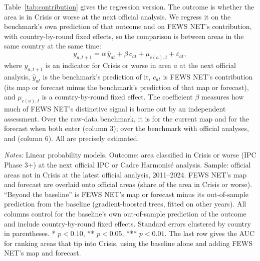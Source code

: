 \documentclass[11pt]{article}
\begin{document}
Table~\ref{tab:contribution} gives the regression version. The outcome is whether the area is in Crisis or worse at the next official analysis. We regress it on the benchmark's own prediction of that outcome and on FEWS NET's contribution, with country-by-round fixed effects, so the comparison is between areas in the same country at the same time:
\begin{equation*}
y_{a,t+1} = \alpha\, \hat{y}_{at} + \beta\, c_{at} + \mu_{c(a),t} + \varepsilon_{at},
\end{equation*}
where $y_{a,t+1}$ is an indicator for Crisis or worse in area $a$ at the next official analysis, $\hat{y}_{at}$ is the benchmark's prediction of it, $c_{at}$ is FEWS NET's contribution (its map or forecast minus the benchmark's prediction of that map or forecast), and $\mu_{c(a),t}$ is a country-by-round fixed effect. The coefficient $\beta$ measures how much of FEWS NET's distinctive signal is borne out by an independent assessment. Over the raw-data benchmark, it is \contribRawCur{} for the current map and \contribRawFc{} for the forecast when both enter (column 3); over the benchmark with official analyses, \contribRawIPCCur{} and \contribRawIPCFc{} (column 6). All are precisely estimated.

\begin{table}[t]
\centering

\caption{Is FEWS NET's distinctive information borne out by independent assessments?}\label{tab:contribution}
\scriptsize
\resizebox{\textwidth}{!}{}
\par\vspace{4pt}\begin{minipage}{\textwidth}\scriptsize \textit{Notes:} Linear probability models. Outcome: area classified in Crisis or worse (IPC Phase 3+) at the next official IPC or Cadre Harmonis\'e analysis. Sample: official areas not in Crisis at the latest official analysis, 2011--2024. FEWS NET's map and forecast are overlaid onto official areas (share of the area in Crisis or worse). ``Beyond the baseline'' is FEWS NET's map or forecast minus its out-of-sample prediction from the baseline (gradient-boosted trees, fitted on other years). All columns control for the baseline's own out-of-sample prediction of the outcome and include country-by-round fixed effects. Standard errors clustered by country in parentheses. * $p<0.10$, ** $p<0.05$, *** $p<0.01$. The last row gives the AUC for ranking areas that tip into Crisis, using the baseline alone and adding FEWS NET's map and forecast.
\end{minipage}

\end{table}
\end{document}
